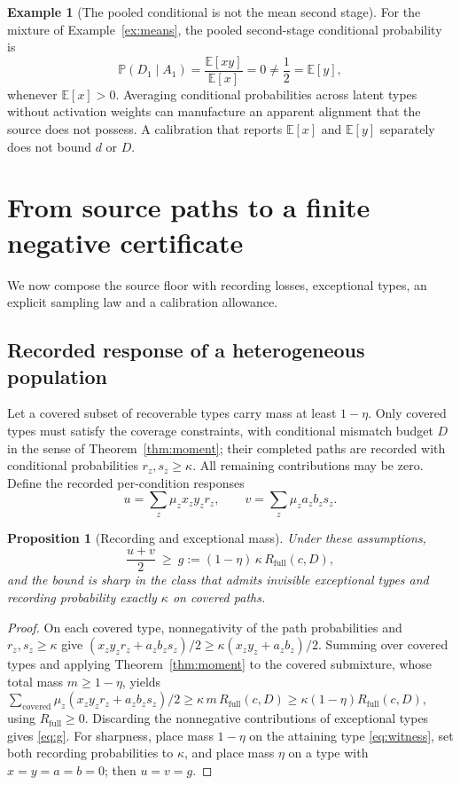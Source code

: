 \documentclass[11pt]{article}
\newtheorem{proposition}[theorem]{Proposition}
\theoremstyle{definition}
\newtheorem{example}[theorem]{Example}
\theoremstyle{remark}
\newcommand{\E}{\mathbb{E}}
\newcommand{\Prob}{\mathbb{P}}
\newcommand{\Rfull}{R_{\mathrm{full}}}
\begin{document}
\begin{example}[The pooled conditional is not the mean second stage]\label{ex:pooled}
For the mixture of Example~\ref{ex:means}, the pooled second-stage conditional
probability is
\[
\Prob(D_1\mid A_1)=\frac{\E[xy]}{\E[x]}=0\neq\frac12=\E[y],
\]
whenever $\E[x]>0$. Averaging conditional probabilities across latent types
without activation weights can manufacture an apparent alignment that the source
does not possess. A calibration that reports $\E[x]$ and $\E[y]$ separately does
not bound $d$ or $D$.
\end{example}

\section{From source paths to a finite negative certificate}\label{sec:certificate}

We now compose the source floor with recording losses, exceptional types, an
explicit sampling law and a calibration allowance.

\subsection{Recorded response of a heterogeneous population}

Let a covered subset of recoverable types carry mass at least $1-\eta$. Only
covered types must satisfy the coverage constraints, with conditional mismatch
budget $D$ in the sense of Theorem~\ref{thm:moment}; their completed paths are
recorded with conditional probabilities $r_z,s_z\ge\kappa$. All remaining
contributions may be zero. Define the recorded per-condition responses
\begin{equation}\label{eq:uv}
u=\sum_z\mu_zx_zy_zr_z,\qquad v=\sum_z\mu_za_zb_zs_z .
\end{equation}

\begin{proposition}[Recording and exceptional mass]\label{prop:record}
Under these assumptions,
\begin{equation}\label{eq:g}
\frac{u+v}{2}\ \ge\ g:=(1-\eta)\,\kappa\,\Rfull(c,D),
\end{equation}
and the bound is sharp in the class that admits invisible exceptional types and
recording probability exactly $\kappa$ on covered paths.
\end{proposition}

\begin{proof}
On each covered type, nonnegativity of the path probabilities and $r_z,s_z\ge
\kappa$ give $(x_zy_zr_z+a_zb_zs_z)/2\ge\kappa(x_zy_z+a_zb_z)/2$. Summing over
covered types and applying Theorem~\ref{thm:moment} to the covered submixture,
whose total mass $m\ge1-\eta$, yields
$\sum_{\text{covered}}\mu_z(x_zy_zr_z+a_zb_zs_z)/2\ge\kappa\,m\,\Rfull(c,D)\ge
\kappa(1-\eta)\Rfull(c,D)$, using $\Rfull\ge0$. Discarding the nonnegative
contributions of exceptional types gives \eqref{eq:g}. For sharpness, place mass
$1-\eta$ on the attaining type \eqref{eq:witness}, set both recording
probabilities to $\kappa$, and place mass $\eta$ on a type with $x=y=a=b=0$;
then $u=v=g$.
\end{proof}
\end{document}
